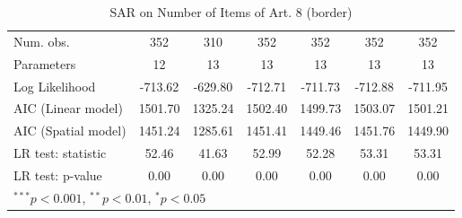 \begin{table}[!h]
\begin{center}
\begin{tabular}{l c c c c c c }
\midrule
Num. obs.               & 352          & 310          & 352          & 352          & 352          & 352          \\
Parameters              & 12           & 13           & 13           & 13           & 13           & 13           \\
Log Likelihood          & -713.62      & -629.80      & -712.71      & -711.73      & -712.88      & -711.95      \\
AIC (Linear model)      & 1501.70      & 1325.24      & 1502.40      & 1499.73      & 1503.07      & 1501.21      \\
AIC (Spatial model)     & 1451.24      & 1285.61      & 1451.41      & 1449.46      & 1451.76      & 1449.90      \\
LR test: statistic      & 52.46        & 41.63        & 52.99        & 52.28        & 53.31        & 53.31        \\
LR test: p-value        & 0.00         & 0.00         & 0.00         & 0.00         & 0.00         & 0.00         \\
\bottomrule
\multicolumn{7}{l}{\scriptsize{$^{***}p<0.001$, $^{**}p<0.01$, $^*p<0.05$}}
\end{tabular}
\caption{SAR on Number of Items of Art. 8 (border)}
\label{table:coefficients}
\end{center}
\end{table}
